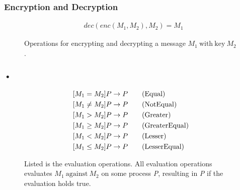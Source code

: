 \subsubsection{Encryption and Decryption}
\begin{figure}[h]
\begin{align*}
    &dec(enc(M_1, M_2),M_2) = M_1 \tag{Decrypt}
\end{align*}
\caption{Operations for encrypting and decrypting a message $M_1\ \mathrm{with\ key}\ M_2$.}
\end{figure}

\subsubsection{•}
\begin{figure}[h]
\begin{align}
    &[M_1 = M_2]P \rightarrow P \tag{Equal}\\
    &[M_1 \neq M_2]P \rightarrow P \tag{NotEqual}\\
    &[M_1 > M_2]P \rightarrow P \tag{Greater}\\
    &[M_1 \geq M_2]P \rightarrow P \tag{GreaterEqual}\\
    &[M_1 < M_2]P \rightarrow P \tag{Lesser}\\
    &[M_1 \leq M_2]P \rightarrow P \tag{LesserEqual}
\end{align}
\caption{Listed is the evaluation operations. All evaluation operations evaluates $M_1\ \mathrm{against}\ M_2$ on some process \textit{P}, resulting in \textit{P} if the evaluation holds true.}
\end{figure}


